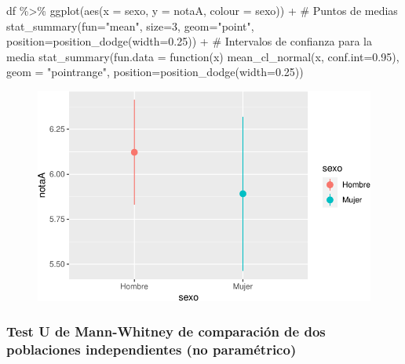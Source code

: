 \documentclass[
  a4paper,
]{scrreport}
\newenvironment{Shaded}{\begin{snugshade}}{\end{snugshade}}
\newcommand{\AttributeTok}[1]{\textcolor[rgb]{0.40,0.45,0.13}{#1}}
\newcommand{\CommentTok}[1]{\textcolor[rgb]{0.37,0.37,0.37}{#1}}
\newcommand{\ControlFlowTok}[1]{\textcolor[rgb]{0.00,0.23,0.31}{#1}}
\newcommand{\DecValTok}[1]{\textcolor[rgb]{0.68,0.00,0.00}{#1}}
\newcommand{\FloatTok}[1]{\textcolor[rgb]{0.68,0.00,0.00}{#1}}
\newcommand{\FunctionTok}[1]{\textcolor[rgb]{0.28,0.35,0.67}{#1}}
\newcommand{\NormalTok}[1]{\textcolor[rgb]{0.00,0.23,0.31}{#1}}
\newcommand{\SpecialCharTok}[1]{\textcolor[rgb]{0.37,0.37,0.37}{#1}}
\newcommand{\StringTok}[1]{\textcolor[rgb]{0.13,0.47,0.30}{#1}}
\theoremstyle{definition}
\theoremstyle{definition}
\theoremstyle{remark}
\begin{document}
\begin{Shaded}
\begin{Highlighting}[]
\NormalTok{df }\SpecialCharTok{\%\textgreater{}\%} \FunctionTok{ggplot}\NormalTok{(}\FunctionTok{aes}\NormalTok{(}\AttributeTok{x =}\NormalTok{ sexo, }\AttributeTok{y =}\NormalTok{ notaA, }\AttributeTok{colour =}\NormalTok{ sexo)) }\SpecialCharTok{+} 
  \CommentTok{\# Puntos de medias}
  \FunctionTok{stat\_summary}\NormalTok{(}\AttributeTok{fun=}\StringTok{"mean"}\NormalTok{, }\AttributeTok{size=}\DecValTok{3}\NormalTok{,  }\AttributeTok{geom=}\StringTok{"point"}\NormalTok{, }\AttributeTok{position=}\FunctionTok{position\_dodge}\NormalTok{(}\AttributeTok{width=}\FloatTok{0.25}\NormalTok{)) }\SpecialCharTok{+} 
  \CommentTok{\# Intervalos de confianza para la media}
  \FunctionTok{stat\_summary}\NormalTok{(}\AttributeTok{fun.data =} \ControlFlowTok{function}\NormalTok{(x) }\FunctionTok{mean\_cl\_normal}\NormalTok{(x, }\AttributeTok{conf.int=}\FloatTok{0.95}\NormalTok{), }\AttributeTok{geom =} \StringTok{"pointrange"}\NormalTok{, }\AttributeTok{position=}\FunctionTok{position\_dodge}\NormalTok{(}\AttributeTok{width=}\FloatTok{0.25}\NormalTok{)) }
\end{Highlighting}
\end{Shaded}

\begin{figure}[H]

{\centering \includegraphics{./08-analisis-estadisticos_files/figure-pdf/unnamed-chunk-35-1.pdf}

}

\end{figure}

\hypertarget{test-u-de-mann-whitney-de-comparaciuxf3n-de-dos-poblaciones-independientes-no-paramuxe9trico}{%
\subsubsection{Test U de Mann-Whitney de comparación de dos poblaciones
independientes (no
paramétrico)}\label{test-u-de-mann-whitney-de-comparaciuxf3n-de-dos-poblaciones-independientes-no-paramuxe9trico}}
\end{document}
